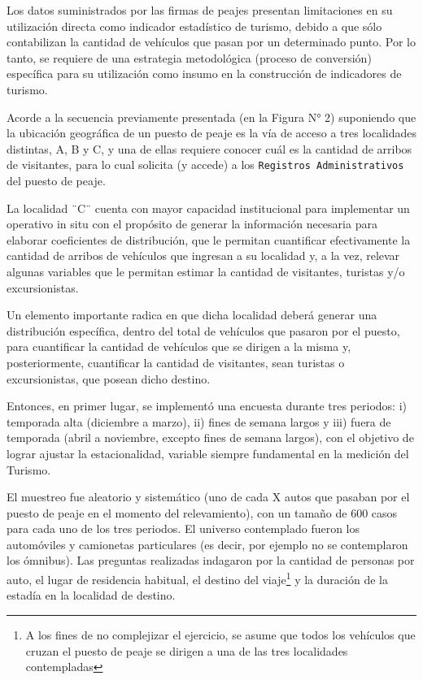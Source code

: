 \documentclass[
]{book}
\begin{document}
Los datos suministrados por las firmas de peajes presentan limitaciones en su utilización directa como indicador estadístico de turismo, debido a que sólo contabilizan la cantidad de vehículos que pasan por un determinado punto. Por lo tanto, se requiere de una estrategia metodológica (proceso de conversión) específica para su utilización como insumo en la construcción de indicadores de turismo.

Acorde a la secuencia previamente presentada (en la Figura N° 2) suponiendo que la ubicación geográfica de un puesto de peaje es la vía de acceso a tres localidades distintas, A, B y C, y una de ellas requiere conocer cuál es la cantidad de arribos de visitantes, para lo cual solicita (y accede) a los \texttt{Registros\ Administrativos} del puesto de peaje.

La localidad ¨C¨ cuenta con mayor capacidad institucional para implementar un operativo in situ con el propósito de generar la información necesaria para elaborar coeficientes de distribución, que le permitan cuantificar efectivamente la cantidad de arribos de vehículos que ingresan a su localidad y, a la vez, relevar algunas variables que le permitan estimar la cantidad de visitantes, turistas y/o excursionistas.

Un elemento importante radica en que dicha localidad deberá generar una distribución específica, dentro del total de vehículos que pasaron por el puesto, para cuantificar la cantidad de vehículos que se dirigen a la misma y, posteriormente, cuantificar la cantidad de visitantes, sean turistas o excursionistas, que posean dicho destino.

Entonces, en primer lugar, se implementó una encuesta durante tres periodos: i) temporada alta (diciembre a marzo), ii) fines de semana largos y iii) fuera de temporada (abril a noviembre, excepto fines de semana largos), con el objetivo de lograr ajustar la estacionalidad, variable siempre fundamental en la medición del Turismo.

El muestreo fue aleatorio y sistemático (uno de cada X autos que pasaban por el puesto de peaje en el momento del relevamiento), con un tamaño de 600 casos para cada uno de los tres periodos. El universo contemplado fueron los automóviles y camionetas particulares (es decir, por ejemplo no se contemplaron los ómnibus). Las preguntas realizadas indagaron por la cantidad de personas por auto, el lugar de residencia habitual, el destino del viaje\footnote{A los fines de no complejizar el ejercicio, se asume que todos los vehículos que cruzan el puesto de peaje se dirigen a una de las tres localidades contempladas} y la duración de la estadía en la localidad de destino.
\end{document}
